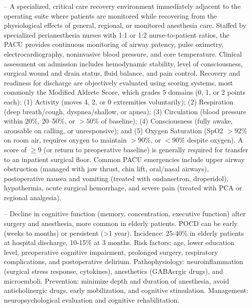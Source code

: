 -- A specialized, critical care recovery environment immediately adjacent to the operating suite where patients are monitored while recovering from the physiological effects of general, regional, or monitored anesthesia care. Staffed by specialized perianesthesia nurses with 1:1 or 1:2 nurse-to-patient ratios, the PACU provides continuous monitoring of airway patency, pulse oximetry, electrocardiography, noninvasive blood pressure, and core temperature. Clinical assessment on admission includes hemodynamic stability, level of consciousness, surgical wound and drain status, fluid balance, and pain control. Recovery and readiness for discharge are objectively evaluated using scoring systems, most commonly the Modified Aldrete Score, which grades 5 domains (0, 1, or 2 points each): (1) Activity (moves 4, 2, or 0 extremities voluntarily); (2) Respiration (deep breath/cough, dyspnea/shallow, or apnea); (3) Circulation (blood pressure within 20\%, 20--50\%, or $>50\%$ of baseline); (4) Consciousness (fully awake, arousable on calling, or unresponsive); and (5) Oxygen Saturation (SpO2 $>92\%$ on room air, requires oxygen to maintain $>90\%$, or $<90\%$ despite oxygen). A score of $\ge 9$ (or return to preoperative baseline) is generally required for transfer to an inpatient surgical floor. Common PACU emergencies include upper airway obstruction (managed with jaw thrust, chin lift, oral/nasal airways), postoperative nausea and vomiting (treated with ondansetron, droperidol), hypothermia, acute surgical hemorrhage, and severe pain (treated with PCA or regional analgesia).

-- Decline in cognitive function (memory, concentration, executive function) after surgery and anesthesia, more common in elderly patients. POCD can be early (weeks to months) or persistent (>1 year). Incidence: 25-40\% in elderly patients at hospital discharge, 10-15\% at 3 months. Risk factors: age, lower education level, preoperative cognitive impairment, prolonged surgery, respiratory complications, and postoperative delirium. Pathophysiology: neuroinflammation (surgical stress response, cytokines), anesthetics (GABAergic drugs), and microemboli. Prevention: minimize depth and duration of anesthesia, avoid anticholinergic drugs, early mobilization, and cognitive stimulation. Management: neuropsychological evaluation and cognitive rehabilitation.

